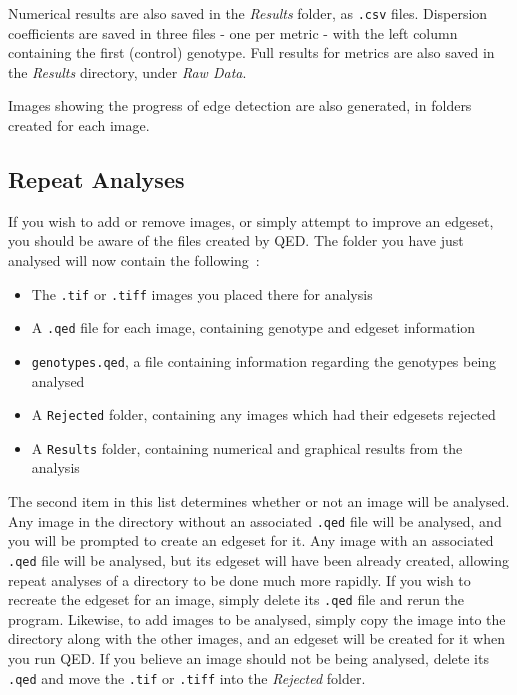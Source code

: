 \documentclass[a4paper,11pt]{article}
\begin{document}
Numerical results are also saved in the \textit{Results} folder, as \texttt{.csv} files. Dispersion coefficients are saved in three files - one per metric - with the left column containing the first (control) genotype. Full results for metrics are also saved in the \textit{Results} directory, under \textit{Raw Data}.

Images showing the progress of edge detection are also generated, in folders created for each image.




\subsection{Repeat Analyses}
If you wish to add or remove images, or simply attempt to improve an edgeset, you should be aware of the files created by QED. The folder you have just analysed will now contain the following~:
\begin{itemize}
 \item The \texttt{.tif} or \texttt{.tiff} images you placed there for analysis
 \item A \texttt{.qed} file for each image, containing genotype and edgeset information
 \item \texttt{genotypes.qed}, a file containing information regarding the genotypes being analysed
 \item A \texttt{Rejected} folder, containing any images which had their edgesets rejected
 \item A \texttt{Results} folder, containing numerical and graphical results from the analysis
\end{itemize}

The second item in this list determines whether or not an image will be analysed. Any image in the directory without an associated \texttt{.qed} file will be analysed, and you will be prompted to create an edgeset for it. Any image with an associated \texttt{.qed} file will be analysed, but its edgeset will have been already created, allowing repeat analyses of a directory to be done much more rapidly. If you wish to recreate the edgeset for an image, simply delete its \texttt{.qed} file and rerun the program. Likewise, to add images to be analysed, simply copy the image into the directory along with the other images, and an edgeset will be created for it when you run QED. If you believe an image should not be being analysed, delete its \texttt{.qed} and move the \texttt{.tif} or \texttt{.tiff} into the \textit{Rejected} folder.
\end{document}
